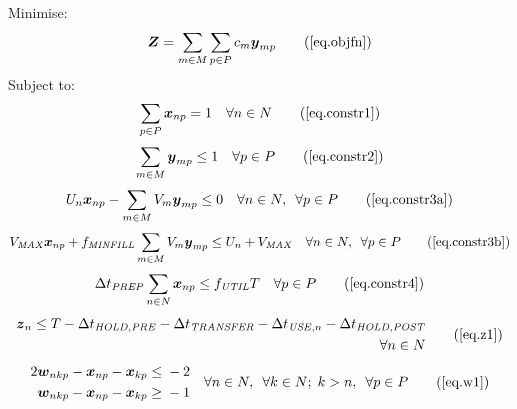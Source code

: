 Minimise:
\begin{equation}
    \boldsymbol{Z} = \sum_{m \in M} \sum_{p \in P} c_m \boldsymbol{y}_{mp}
    \tag{\ref{eq.objfn}}
\end{equation}
Subject to:
\begin{equation}
    \sum_{p \in P} \boldsymbol{x}_{np} = 1 \quad \forall n \in N
    \tag{\ref{eq.constr1}}
\end{equation}
\begin{equation}
    \sum_{m \in M} \boldsymbol{y}_{mp} \le 1 \quad \forall p \in P
    \tag{\ref{eq.constr2}}
\end{equation}
\begin{equation}
    U_{n} \boldsymbol{x}_{np} - \sum_{m \in M} V_{m} \boldsymbol{y}_{mp} \le 0
    \quad \forall n \in N, \enspace \forall p \in P
    \tag{\ref{eq.constr3a}}
\end{equation}
\begin{equation}
    V_{\mathit{MAX}} \boldsymbol{x}_{np} + f_{\mathit{MINFILL}} \sum_{m \in M}
    V_{m} \boldsymbol{y}_{mp} \le U_{n} + V_{\mathit{MAX}} \quad \forall n \in
    N, \enspace \forall p \in P
    \tag{\ref{eq.constr3b}}
\end{equation}
\begin{equation}
    \Delta t_{\mathit{PREP}} \sum_{n \in N} \boldsymbol{x}_{np} \le
    f_{\mathit{UTIL}} T \quad \forall p \in P
    \tag{\ref{eq.constr4}}
\end{equation}
\begin{equation}
    \begin{aligned}
        \boldsymbol{z}_{n} \le T - \Delta t_{\mathit{HOLD,PRE}}
        - \Delta t_{\mathit{TRANSFER}} - \Delta t_{\mathit{USE},n}
        - \Delta t_{\mathit{HOLD,POST}}\\
        \quad \forall n \in N
    \end{aligned}
    \tag{\ref{eq.z1}}
\end{equation}
\begin{equation}
    \begin{split}
        \begin{alignedat}{11}
            2&\boldsymbol{w}_{nkp} {}-{} &&\boldsymbol{x}_{np}
            {}-{} && \boldsymbol{x}_{kp} {}&&\le{} &{}-{} 2\\
            &\boldsymbol{w}_{nkp} {}-{} &&\boldsymbol{x}_{np}
            {}-{} && \boldsymbol{x}_{kp} {}&&\ge{} &{}-{} 1\\
        \end{alignedat}
    \end{split}
    \quad
    \begin{split}
        \forall n \in N, \enspace \forall k \in N; \; k > n, \enspace 
        \forall p \in P
    \end{split}
    \tag{\ref{eq.w1}}
\end{equation}
